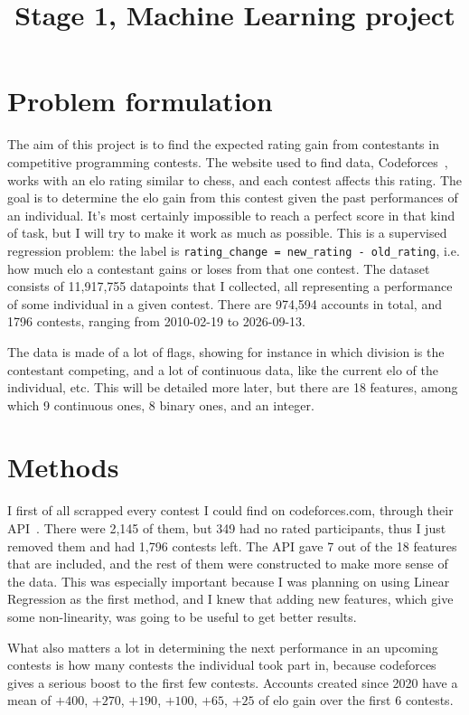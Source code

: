\documentclass[11pt,a4paper]{article}
\title{Stage 1, Machine Learning project}
\author{}
\date{}
\begin{document}
\maketitle
\vspace{-3em}

\section*{Problem formulation}

The aim of this project is to find the expected rating gain from contestants in competitive programming contests. The website used to find data, Codeforces~\cite{codeforces}, works with an elo rating similar to chess, and each contest affects this rating. The goal is to determine the elo gain from this contest given the past performances of an individual. It's most certainly impossible to reach a perfect score in that kind of task, but I will try to make it work as much as possible. This is a supervised regression problem: the label is \texttt{rating\_change = new\_rating - old\_rating}, i.e. how much elo a contestant gains or loses from that one contest.
The dataset consists of 11,917,755 datapoints that I collected, all representing a performance of some individual in a given contest. There are 974,594 accounts in total, and 1796 contests, ranging from 2010-02-19 to 2026-09-13.

The data is made of a lot of flags, showing for instance in which division is the contestant competing, and a lot of continuous data, like the current elo of the individual, etc. This will be detailed more later, but there are 18 features, among which 9 continuous ones, 8 binary ones, and an integer.

\section*{Methods}

I first of all scrapped every contest I could find on codeforces.com, through their API~\cite{cfapi}. There were 2,145 of them, but 349 had no rated participants, thus I just removed them and had 1,796 contests left. The API gave 7 out of the 18 features that are included, and the rest of them were constructed to make more sense of the data. This was especially important because I was planning on using Linear Regression as the first method, and I knew that adding new features, which give some non-linearity, was going to be useful to get better results.

What also matters a lot in determining the next performance in an upcoming contests is how many contests the individual took part in, because codeforces gives a serious boost to the first few contests. Accounts created since 2020 have a mean of $+400$, $+270$, $+190$, $+100$, $+65$, $+25$ of elo gain over the first 6 contests.
\end{document}
